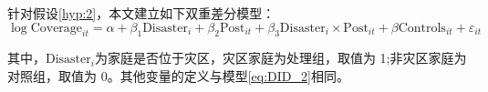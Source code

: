 针对假设\ref{hyp:2}，本文建立如下双重差分模型：
\begin{equation}
    \log\text{Coverage}_{it}=\alpha+\beta_1\text{Disaster}_{i}+\beta_2\text{Post}_{it}+\beta_3\text{Disaster}_{i}\times\text{Post}_{it}+\beta\text{Controls}_{it}+\varepsilon_{it}
    \label{eq:DID_1}
\end{equation}

其中，$\text{Disaster}_{i}$为家庭是否位于灾区，灾区家庭为处理组，取值为 1;非灾区家庭为对照组，取值为 0。其他变量的定义与模型\ref{eq:DID_2}相同。

